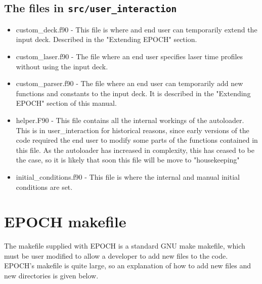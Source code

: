 \documentclass[12pt]{article}
\newcommand{\inlinecode}[1]{{\color{warwickred} \bf\texttt{#1}}}
\newcommand{\nEPOCH}{{\color{warwickdark}\fontfamily{phv}\selectfont EPOCH}}
\newcommand{\EPOCH}{{\nEPOCH} }
\begin{document}
\subsection{The files in \inlinecode{src/user\_interaction}}
\begin{itemize}
\item custom\_deck.f90 - This file is where and end user can temporarily
  extend the input deck. Described in the "Extending EPOCH" section.
\item custom\_laser.f90 - The file where an end user specifies laser time
  profiles without using the input deck.
\item custom\_parser.f90 - The file where an end user can temporarily add new
  functions and constants to the input deck. It is described in the "Extending
  EPOCH" section of this manual.
\item helper.F90 - This file contains all the internal workings of the
  autoloader. This is in user\_interaction for historical reasons, since early
  versions of the code required the end user to modify some parts of the
  functions contained in this file. As the autoloader has increased in
  complexity, this has ceased to be the case, so it is likely that soon this
  file will be move to "housekeeping"
\item initial\_conditions.f90 - This file is where the internal and manual
  initial conditions are set.
\end{itemize}

\section{\EPOCH makefile}
The makefile supplied with \EPOCH is a standard GNU make makefile, which must
be user modified to allow a developer to add new files to the code. EPOCH's
makefile is quite large, so an explanation of how to add new files and new
directories is given below.
\end{document}
